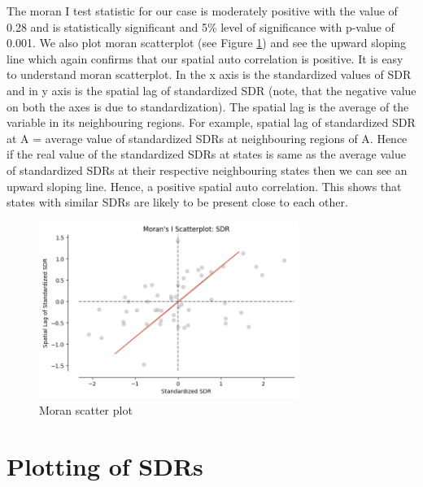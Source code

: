 \documentclass[enabledeprecatedfontcommands,parskip=half,twoside=semi,BCOR=0mm]{scrreprt}
\numberwithin{equation}{chapter}
\theoremstyle{definition}
\theoremstyle{remark}
\begin{document}
    The moran I test statistic for our case is moderately positive with the value of 0.28 and is statistically significant and 5\% level of significance with p-value of 0.001. We also plot moran scatterplot (see Figure \ref{fig:Figure 1}) and see the upward sloping line which again confirms that our spatial auto correlation is positive. It is easy to understand moran scatterplot. In the x axis is the standardized values of SDR and in y axis is the spatial lag of standardized SDR (note, that the negative value on both the axes is due to standardization). The spatial lag is the average of the variable in its neighbouring regions. For example, spatial lag of standardized SDR at A = average value of standardized SDRs at neighbouring regions of A. Hence if the real value of the standardized SDRs at states is same as the average value of standardized SDRs at their respective neighbouring states then we can see an upward sloping line. Hence, a positive spatial auto correlation. This shows that states with similar SDRs are likely to be present close to each other.
    \begin{figure}[h]
    \centering
    \includegraphics[width=0.75\textwidth]{Moran_I.png}
    \caption{Moran scatter plot}
    \label{fig:Figure 1}
    \end{figure}
    
    \section{Plotting of SDRs}
    
\end{document}
